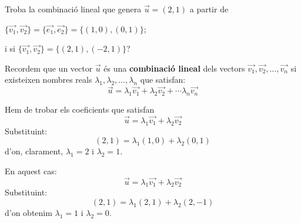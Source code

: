 \Exercise Troba la combinació lineal que genera $\vec{u}=(2,1)$ a partir de
\begin{llista}
  \item  $\{\overrightarrow{v_1},\overrightarrow{v_2}\} = \{\overrightarrow{e_1},\overrightarrow{e_2}\} = \{ (1,0),(0,1) \}$; 
  \item i si $\{\overrightarrow{v_1},\overrightarrow{v_2}\} = \{ (2,1),(-2,1) \}$?
\end{llista}

\Answer Recordem que un vector $\vec{u}$ és una {\bf combinació lineal} dels vectors $\overrightarrow{v_1},\overrightarrow{v_2}, \ldots , \overrightarrow{v_n}$ si existeixen nombres reals $\lambda_1, \lambda_2, \ldots, \lambda_n$ que satisfan:
\[\vec{u} = \lambda_1 \overrightarrow{v_1} + \lambda_2 \overrightarrow{v_2} + \cdots \lambda_n \overrightarrow{v_n}\]

\begin{llista}
  \item Hem de trobar els coeficients que satisfan 
  \[\vec{u} = \lambda_1 \overrightarrow{v_1} + \lambda_2 \overrightarrow{v_2} \]
  Substituint:
  \[(2,1)=\lambda_1 (1,0) + \lambda_2 (0,1)\]
  d'on, clarament, $\lambda_1=2$ i $\lambda_2=1$.
  \item En aquest cas:
  \[\vec{u} = \lambda_1 \overrightarrow{v_1} + \lambda_2 \overrightarrow{v_2} \]
  Substituint:
  \[(2,1)=\lambda_1 (2,1) + \lambda_2 (2,-1)\]
  d'on obtenim $\lambda_1=1$ i $\lambda_2=0$.
\end{llista}
\blacksquare

